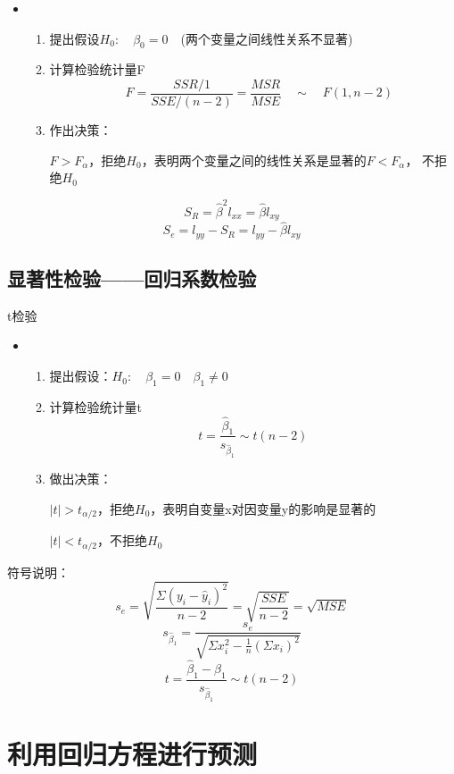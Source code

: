 \documentclass[UTF8,10pt]{book}
\begin{document}
\begin{itemize}
	\item [] {
		\begin{enumerate}
			\item 提出假设$H_0 :\quad \beta_0 = 0 \quad$(两个变量之间线性关系不显著)
			\item 计算检验统计量F $$\quad F = \frac{SSR/1}{SSE/(n-2)} =\frac{MSR}{MSE} \quad \sim \quad F(1,n-2) $$		
			\item 作出决策：
			
			$F>F_{\alpha}$，拒绝$H_0$，表明两个变量之间的线性关系是显著的$F<F_{\alpha}$，
			不拒绝$H_0$ 
			
		\end{enumerate}
	}
\end{itemize}

$$ S_R = \hat{\beta}^2 l_{xx}=\hat{\beta}l_{xy} $$ 
$$ S_e = l_{yy} - S_R = l_{yy}-\hat{\beta}l_{xy} $$

\subsection{显著性检验——回归系数检验}	
t检验 







\begin{itemize}
	\item [] {
		\begin{enumerate}
			\item 提出假设：$H_0: \quad \beta_1 = 0 \quad \beta_1 \neq 0$
			\item 计算检验统计量t $$t = \frac{\hat{\beta}_1}{s_{\hat{\beta}_1}} \sim t(n-2) $$		
			\item 做出决策：
			
			$|t|>t_{\alpha/2}$，拒绝$H_0$，表明自变量x对因变量y的影响是显著的
			
			$|t|<t_{\alpha/2}$，不拒绝$H_0$ 
			
		\end{enumerate}
	}
\end{itemize}

符号说明： 
$$ s_e = \sqrt{\frac{\Sigma (y_i - \hat{y}_i)^2}{n-2}} = \sqrt{\frac{SSE}{n-2}}=\sqrt{MSE} $$ 
$$s_{\hat{\beta}_1} = \frac{s_e}{\sqrt{\Sigma x_i^2 - \frac{1}{n}(\Sigma x_i)^2}} $$ 
$$t = \frac{\hat{\beta}_1 - \beta_1}{s_{\hat{\beta}_1}} \sim t(n-2)$$

\section{利用回归方程进行预测}
\end{document}
